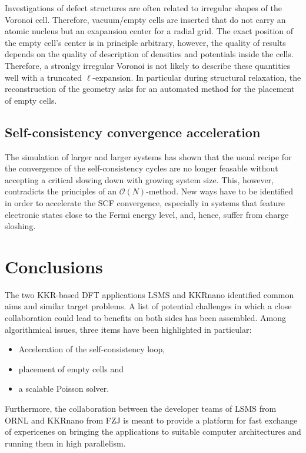 \documentclass{llncs}
\def\KKRnano{{KKRnano}}
\def\LSMS{{LSMS}}
\begin{document}
Investigations of defect structures are often related to irregular
shapes of the Voronoi cell. Therefore, vacuum/empty cells are inserted that do not carry an atomic nucleus
but an exapansion center for a radial grid.
The exact position of the empty cell's center is in principle arbitrary, however, the quality of results
depends on the quality of description of densities and potentials inside the cells. Therefore,
a stronlgy irregular Voronoi is not likely to describe these quantities well with a truncated $\ell$-expansion.
In particular during structural relaxation, the reconstruction of the geometry
asks for an automated method for the placement of empty cells.


\subsection{Self-consistency convergence acceleration} %

The simulation of larger and larger systems has shown that the usual recipe for the
convergence of the self-consistency cycles are no longer feasable without accepting a critical
slowing down with growing system size. 
This, however, contradicts the principles of an $\mathcal O(N)$-method.
New ways have to be identified in order to accelerate the SCF convergence, especially in systems
that feature electronic states close to the Fermi energy level, and, hence, suffer from charge sloshing.


\section{Conclusions}\label{section:summary}

The two KKR-based DFT applications \LSMS{} and \KKRnano{} identified common aims and similar target problems.
A list of potential challenges in which a close collaboration could lead to benefits on both sides has been assembled. 
Among algorithmical issues, three items have been highlighted in particular: 
\begin{itemize}
 \item Acceleration of the self-consistency loop,
 \item placement of empty cells and
 \item a scalable Poisson solver.
\end{itemize}
Furthermore, the collaboration between the developer teams of 
\LSMS{} from ORNL 
and
\KKRnano{} from FZJ
is meant to provide a platform for fast exchange of expericenes on
bringing the applications to suitable computer architectures and running them in high parallelism.
\end{document}

